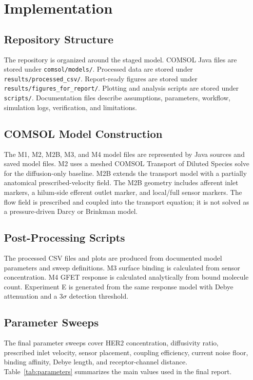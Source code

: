 ﻿\documentclass[12pt,a4paper,oneside]{report}
\begin{document}
\chapter{Implementation}

\section{Repository Structure}
The repository is organized around the staged model. COMSOL Java files are stored under \texttt{comsol/models/}. Processed data are stored under \texttt{results/processed\_csv/}. Report-ready figures are stored under \texttt{results/figures\_for\_report/}. Plotting and analysis scripts are stored under \texttt{scripts/}. Documentation files describe assumptions, parameters, workflow, simulation logs, verification, and limitations.

\section{COMSOL Model Construction}
The M1, M2, M2B, M3, and M4 model files are represented by Java sources and saved model files. M2 uses a meshed COMSOL Transport of Diluted Species solve for the diffusion-only baseline. M2B extends the transport model with a partially anatomical prescribed-velocity field. The M2B geometry includes afferent inlet markers, a hilum-side efferent outlet marker, and local/full sensor markers. The flow field is prescribed and coupled into the transport equation; it is not solved as a pressure-driven Darcy or Brinkman model.

\section{Post-Processing Scripts}
The processed CSV files and plots are produced from documented model parameters and sweep definitions. M3 surface binding is calculated from sensor concentration. M4 GFET response is calculated analytically from bound molecule count. Experiment E is generated from the same response model with Debye attenuation and a $3\sigma$ detection threshold.

\section{Parameter Sweeps}
The final parameter sweeps cover HER2 concentration, diffusivity ratio, prescribed inlet velocity, sensor placement, coupling efficiency, current noise floor, binding affinity, Debye length, and receptor-channel distance. Table~\ref{tab:parameters} summarizes the main values used in the final report.
\end{document}
